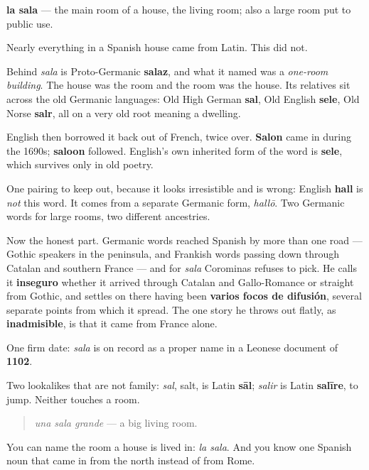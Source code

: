 \begin{cousinweb}
\textbf{la sala} — the main room of a house, the living room; also a large room put to public use.

Nearly everything in a Spanish house came from Latin. This did not.

Behind \emph{sala} is Proto-Germanic \textbf{salaz}, and what it named was a \emph{one-room building}. The house was the room and the room was the house. Its relatives sit across the old Germanic languages: Old High German \textbf{sal}, Old English \textbf{sele}, Old Norse \textbf{salr}, all on a very old root meaning a dwelling.

English then borrowed it back out of French, twice over. \textbf{Salon} came in during the 1690s; \textbf{saloon} followed. English's own inherited form of the word is \textbf{sele}, which survives only in old poetry.

One pairing to keep out, because it looks irresistible and is wrong: English \textbf{hall} is \emph{not} this word. It comes from a separate Germanic form, \emph{hallō}. Two Germanic words for large rooms, two different ancestries.

Now the honest part. Germanic words reached Spanish by more than one road — Gothic speakers in the peninsula, and Frankish words passing down through Catalan and southern France — and for \emph{sala} Corominas refuses to pick. He calls it \textbf{inseguro} whether it arrived through Catalan and Gallo-Romance or straight from Gothic, and settles on there having been \textbf{varios focos de difusión}, several separate points from which it spread. The one story he throws out flatly, as \textbf{inadmisible}, is that it came from France alone.

One firm date: \emph{sala} is on record as a proper name in a Leonese document of \textbf{1102}.

Two lookalikes that are not family: \emph{sal}, salt, is Latin \textbf{sāl}; \emph{salir} is Latin \textbf{salīre}, to jump. Neither touches a room.

\begin{quote}
\emph{una sala grande} — a big living room.
\end{quote}
\end{cousinweb}

\begin{grammarlens}[title={What you've built}]
You can name the room a house is lived in: \emph{la sala}. And you know one Spanish noun that came in from the north instead of from Rome.
\end{grammarlens}

